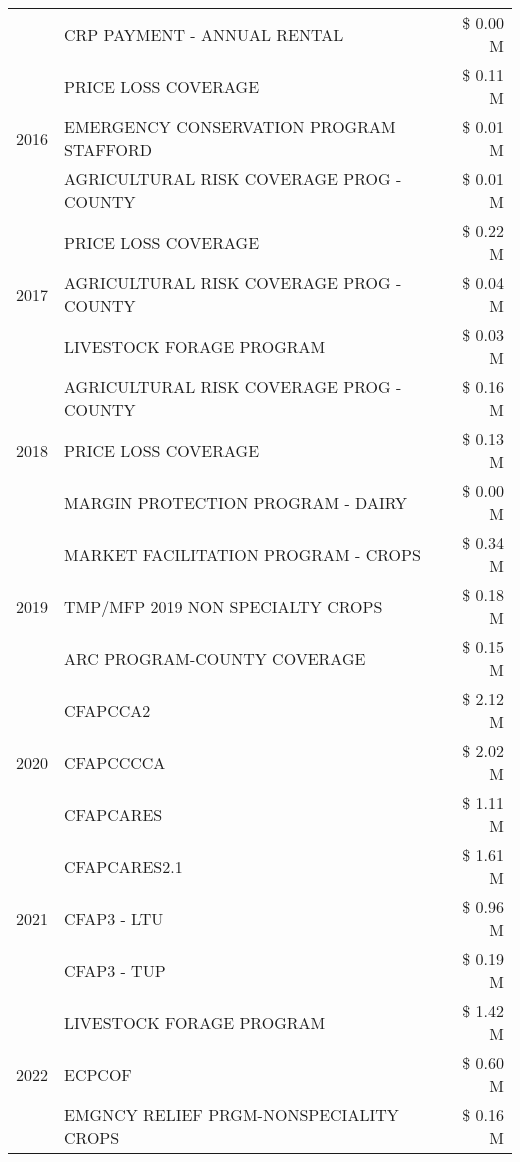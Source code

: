 \begin{tabular}{llr}
 & CRP PAYMENT - ANNUAL RENTAL & \$ 0.00 M \\
\cline{1-3}
\multirow[t]{3}{*}{2016} & PRICE LOSS COVERAGE & \$ 0.11 M \\
 & EMERGENCY CONSERVATION PROGRAM STAFFORD & \$ 0.01 M \\
 & AGRICULTURAL RISK COVERAGE PROG - COUNTY & \$ 0.01 M \\
\cline{1-3}
\multirow[t]{3}{*}{2017} & PRICE LOSS COVERAGE & \$ 0.22 M \\
 & AGRICULTURAL RISK COVERAGE PROG - COUNTY & \$ 0.04 M \\
 & LIVESTOCK FORAGE PROGRAM & \$ 0.03 M \\
\cline{1-3}
\multirow[t]{3}{*}{2018} & AGRICULTURAL RISK COVERAGE PROG - COUNTY & \$ 0.16 M \\
 & PRICE LOSS COVERAGE & \$ 0.13 M \\
 & MARGIN PROTECTION PROGRAM - DAIRY & \$ 0.00 M \\
\cline{1-3}
\multirow[t]{3}{*}{2019} & MARKET FACILITATION PROGRAM - CROPS & \$ 0.34 M \\
 & TMP/MFP 2019 NON SPECIALTY CROPS & \$ 0.18 M \\
 & ARC PROGRAM-COUNTY COVERAGE & \$ 0.15 M \\
\cline{1-3}
\multirow[t]{3}{*}{2020} & CFAPCCA2 & \$ 2.12 M \\
 & CFAPCCCCA & \$ 2.02 M \\
 & CFAPCARES & \$ 1.11 M \\
\cline{1-3}
\multirow[t]{3}{*}{2021} & CFAPCARES2.1 & \$ 1.61 M \\
 & CFAP3 - LTU & \$ 0.96 M \\
 & CFAP3 - TUP & \$ 0.19 M \\
\cline{1-3}
\multirow[t]{3}{*}{2022} & LIVESTOCK FORAGE PROGRAM & \$ 1.42 M \\
 & ECPCOF & \$ 0.60 M \\
 & EMGNCY RELIEF PRGM-NONSPECIALITY CROPS & \$ 0.16 M \\
\cline{1-3}
\bottomrule
\end{tabular}
